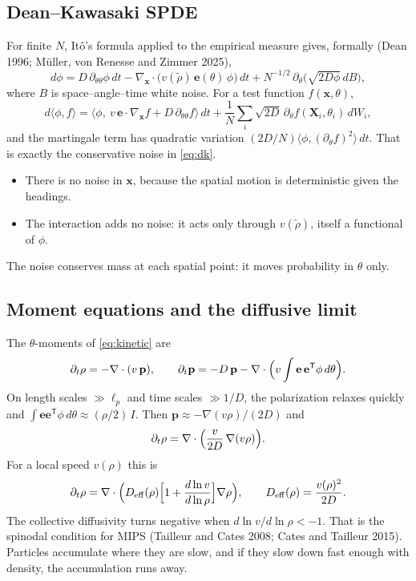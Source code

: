 \documentclass[11pt]{article}
\newcommand{\e}{\mathbf{e}}
\newcommand{\rt}{\tilde\rho}
\begin{document}
\subsection{Dean--Kawasaki SPDE}
For finite $N$, Itô's formula applied to the empirical measure gives,
formally (Dean 1996; Müller, von Renesse and Zimmer 2025),
\begin{equation}
  d\phi = D\,\partial_{\theta\theta}\phi\,dt
    - \nabla_{\mathbf{x}}\cdot\bigl(v(\rt)\,\e(\theta)\,\phi\bigr)\,dt
    + N^{-1/2}\,\partial_\theta\bigl(\sqrt{2D\phi}\,dB\bigr),
  \label{eq:dk}
\end{equation}
where $B$ is space--angle--time white noise. For a test function
$f(\mathbf{x},\theta)$,
\begin{equation}
  d\langle\phi,f\rangle = \bigl\langle\phi,\ v\,\e\cdot\nabla_{\mathbf{x}}f
      + D\,\partial_{\theta\theta}f\bigr\rangle\,dt
    + \frac1N\sum_i\sqrt{2D}\,\partial_\theta f(\mathbf{X}_i,\theta_i)\,dW_i ,
\end{equation}
and the martingale term has quadratic variation
$(2D/N)\langle\phi,(\partial_\theta f)^2\rangle\,dt$. That is exactly the
conservative noise in \eqref{eq:dk}.
\begin{itemize}
  \item There is no noise in $\mathbf{x}$, because the spatial motion is
        deterministic given the headings.
  \item The interaction adds no noise: it acts only through $v(\rt)$, itself
        a functional of $\phi$.
\end{itemize}
The noise conserves mass at each spatial point: it moves probability in
$\theta$ only.

\subsection{Moment equations and the diffusive limit}
The $\theta$-moments of \eqref{eq:kinetic} are
\begin{equation}
  \partial_t\rho = -\nabla\cdot(v\,\mathbf{p}), \qquad
  \partial_t\mathbf{p} = -D\,\mathbf{p}
     - \nabla\cdot\Bigl(v\int\e\,\e^{\mathsf T}\phi\,d\theta\Bigr).
\end{equation}
On length scales $\gg\ell_p$ and time scales $\gg 1/D$, the polarization
relaxes quickly and $\int\e\e^{\mathsf T}\phi\,d\theta\approx(\rho/2)\,I$.
Then $\mathbf{p}\approx-\nabla(v\rho)/(2D)$ and
\begin{equation}
  \partial_t\rho = \nabla\cdot\Bigl(\frac{v}{2D}\,\nabla(v\rho)\Bigr).
\end{equation}
For a local speed $v(\rho)$ this is
\begin{equation}
  \partial_t\rho = \nabla\cdot\Bigl(D_{\mathrm{eff}}(\rho)
     \Bigl[1+\frac{d\ln v}{d\ln\rho}\Bigr]\nabla\rho\Bigr),
  \qquad D_{\mathrm{eff}}(\rho) = \frac{v(\rho)^2}{2D}.
\end{equation}
The collective diffusivity turns negative when $d\ln v/d\ln\rho<-1$. That is
the spinodal condition for MIPS (Tailleur and Cates 2008; Cates and Tailleur
2015). Particles accumulate where they are slow, and if they slow down fast
enough with density, the accumulation runs away.
\end{document}

